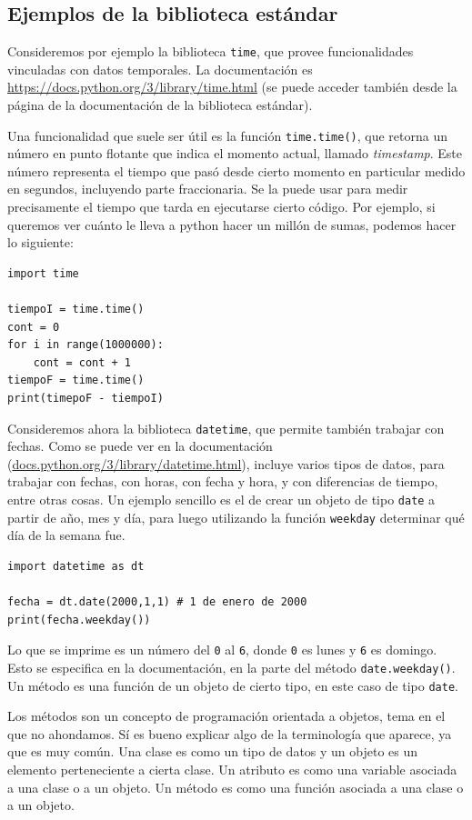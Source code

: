 \documentclass[a4paper, 12pt]{report}
\theoremstyle{definition}
\begin{document}
\subsection{Ejemplos de la biblioteca estándar}

Consideremos por ejemplo la biblioteca {\tt time}, que provee funcionalidades vinculadas con datos temporales. La documentación es \href{https://docs.python.org/3/library/time.html}{https://docs.python.org/3/library/time.html} (se puede acceder también desde la página de la documentación de la biblioteca estándar).

Una funcionalidad que suele ser útil es la función {\tt time.time()}, que retorna un número en punto flotante que indica el momento actual, llamado {\sl timestamp}. Este número representa el tiempo que pasó desde cierto momento en particular medido en segundos, incluyendo parte fraccionaria. Se la puede usar para medir precisamente el tiempo que tarda en ejecutarse cierto código. Por ejemplo, si queremos ver cuánto le lleva a python hacer un millón de sumas, podemos hacer lo siguiente:
\begin{verbatim}
import time

tiempoI = time.time()
cont = 0
for i in range(1000000):
    cont = cont + 1
tiempoF = time.time()
print(timepoF - tiempoI)
\end{verbatim}

\vspace{1em}
Consideremos ahora la biblioteca {\tt datetime}, que permite también trabajar con fechas. Como se puede ver en la documentación (\href{https://docs.python.org/3/library/datetime.html}{docs.python.org/3/library/datetime.html}), incluye varios tipos de datos, para trabajar con fechas, con horas, con fecha y hora, y con diferencias de tiempo, entre otras cosas. Un ejemplo sencillo es el de crear un objeto de tipo {\tt date} a partir de año, mes y día, para luego utilizando la función {\tt weekday} determinar qué día de la semana fue.
\begin{verbatim}
import datetime as dt

fecha = dt.date(2000,1,1) # 1 de enero de 2000
print(fecha.weekday())
\end{verbatim}
Lo que se imprime es un número del {\tt 0} al {\tt 6}, donde {\tt 0} es lunes y {\tt 6} es domingo. Esto se especifica en la documentación, en la parte del método {\tt date.weekday()}. Un método es una función de un objeto de cierto tipo, en este caso de tipo {\tt date}.

Los métodos son un concepto de programación orientada a objetos, tema en el que no ahondamos. Sí es bueno explicar algo de la terminología que aparece, ya que es muy común. Una clase es como un tipo de datos y un objeto es un elemento perteneciente a cierta clase. Un atributo es como una variable asociada a una clase o a un objeto. Un método es como una función asociada a una clase o a un objeto.
\end{document}
